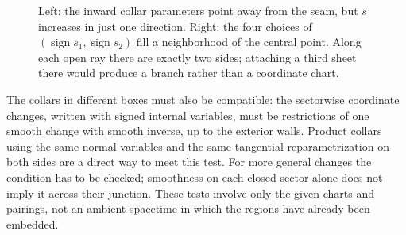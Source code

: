 \begin{figure}[htbp]
\centering
{}
\caption{Left: the inward collar parameters point away from the seam, but $s$ increases in just one direction. Right: the four choices of $(\operatorname{sign}s_1,\operatorname{sign}s_2)$ fill a neighborhood of the central point. Along each open ray there are exactly two sides; attaching a third sheet there would produce a branch rather than a coordinate chart.}
\label{fig:01-sectors}
\end{figure}

The collars in different boxes must also be compatible: the sectorwise coordinate changes, written with signed internal variables, must be restrictions of one smooth change with smooth inverse, up to the exterior walls. Product collars using the same normal variables and the same tangential reparametrization on both sides are a direct way to meet this test. For more general changes the condition has to be checked; smoothness on each closed sector alone does not imply it across their junction. These tests involve only the given charts and pairings, not an ambient spacetime in which the regions have already been embedded.

